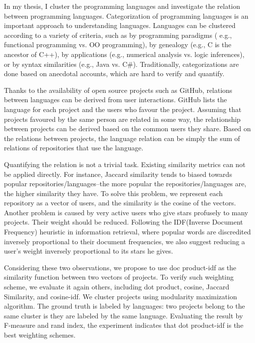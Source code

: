 \documentclass[12pt,oneside,final]{vlsithesis}
\begin{document}
In my thesis, I cluster the programming languages and  investigate the relation between programming languages. Categorization of programming languages is an important approach to understanding languages. Languages can be clustered according to a variety of criteria, such as  by programming paradigms ( e.g., functional programming vs. OO programming), by genealogy (e.g., C is the ancestor of C++), by applications (e.g., numerical analysis vs. logic inferences), or by syntax similarities (e.g., Java vs. C\#).  Traditionally, categorizations are done based on anecdotal accounts, which are hard to verify and quantify. 

Thanks to the availability of open source projects such as GitHub, relations between languages can be derived from user interactions. GitHub lists the language for each project and the users who favour the project. Assuming that projects favoured by the same person are related in some way, the relationship between projects can be derived based on the common users they share. Based on the relations between projects, the language relation can be simply the sum of relations of repositories that use the language.  

Quantifying the relation is not a trivial task. Existing similarity metrics can not be applied directly. For instance, Jaccard similarity tends to biased towards popular repositories/languages--the more popular the repositories/languages are, the higher similarity they have.  To solve this problem, we represent each repository as a vector of users, and the similarity is the cosine of the vectors. Another problem is caused by very active users who give stars profusely to many projects.  Their weight should be reduced. Following the IDF(Inverse Document Frequency) heuristic in information retrieval, where popular words are discredited inversely proportional to their document frequencies, we also suggest reducing a user's weight inversely proportional to its stars he gives. 

Considering these two observations, we propose to use doc product-idf as the similarity function between two vectors of projects. To verify such weighting scheme, we evaluate it again others, including dot product, cosine, Jaccard Similarity, and cosine-idf.  We cluster projects using modularity maximization algorithm. The ground truth is labeled by languages: two projects belong to the same cluster is they are labeled by the same language.  Evaluating the result by F-measure and rand index, the experiment indicates that dot product-idf is the best weighting schemes.
\end{document}
